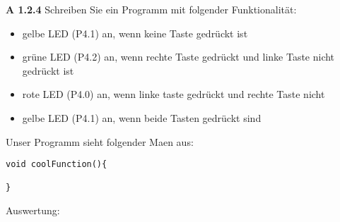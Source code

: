 \begin{description}
\begin{enumerate}
\end{enumerate}

\item{\bfseries A 1.2.4} Schreiben Sie ein Programm mit folgender Funktionalität:

\begin{itemize}

\item gelbe LED (P4.1) an, wenn keine Taste gedrückt ist
\item grüne LED (P4.2) an, wenn rechte Taste gedrückt und linke Taste nicht gedrückt ist
\item rote LED (P4.0) an, wenn linke taste gedrückt und rechte Taste nicht
\item gelbe LED (P4.1) an, wenn beide Tasten gedrückt sind

\end{itemize}

Unser Programm sieht folgender Maen aus:

\begin{lstlisting}
void coolFunction(){

}
\end{lstlisting}

Auswertung:

\end{description}